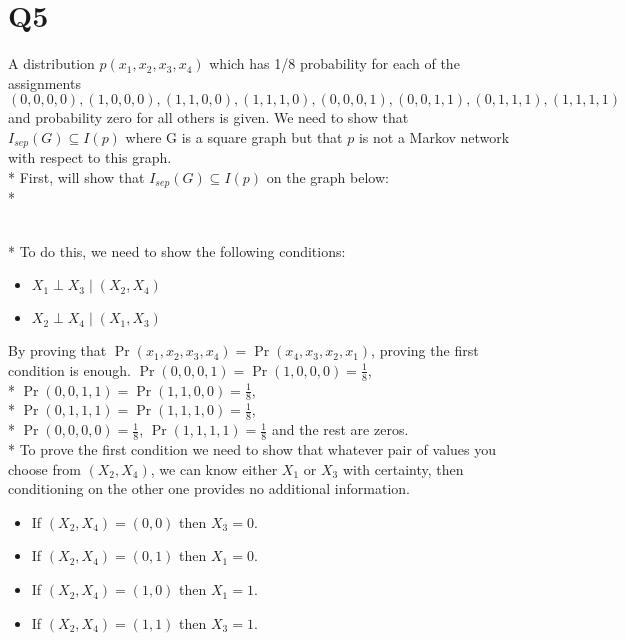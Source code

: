 \documentclass[11pt]{article}
\begin{document}
\part*{Q5}
A distribution $p(x_1,x_2,x_3,x_4)$ which has 1/8 probability for each of the assignments $(0,0,0,0),(1,0,0,0),(1,1,0,0),(1,1,1,0),(0,0,0,1),(0,0,1,1),(0,1,1,1),(1,1,1,1)$ and probability zero for all 	others is given. We need to show that $I_{sep}(G)\subseteq I(p)$ where G is a square graph but that $p$ is not a Markov network with respect to this graph. \\*
First, will show that $I_{sep}(G) \subseteq I(p)$ on the graph below: \\*
 \\*
To do this, we need to show the following conditions:
\begin{itemize}
	\item $X_1 \perp X_3 \mid (X_2, X_4)$
	\item $X_2 \perp X_4 \mid (X_1, X_3)$
\end{itemize}
By proving that $\Pr(x_1,x_2,x_3,x_4) = \Pr(x_4,x_3,x_2,x_1)$, proving the first condition is enough.
$\Pr(0,0,0,1) = \Pr(1,0,0,0) = \frac{1}{8}$, \\*
$\Pr(0,0,1,1) = \Pr(1,1,0,0) = \frac{1}{8}$, \\*
$\Pr(0,1,1,1) = \Pr(1,1,1,0) = \frac{1}{8}$, \\*
$\Pr(0,0,0,0) = \frac{1}{8}$, $\Pr(1,1,1,1) = \frac{1}{8}$ and the rest are zeros. \\*
To prove the first condition we need to show that whatever pair of values you choose from $(X_2,X_4)$, we can know either $X_1$ or $X_3$ with certainty, then conditioning on the other one provides 	no additional information.
\begin{itemize}
	\item If $(X_2,X_4) = (0,0)$ then $X_3=0$.
	\item If $(X_2,X_4) = (0,1)$ then $X_1=0$.
	\item If $(X_2,X_4) = (1,0)$ then $X_1=1$.
	\item If $(X_2,X_4) = (1,1)$ then $X_3=1$.
\end{itemize}
\end{document}
